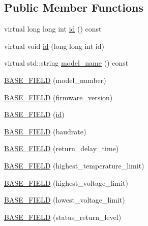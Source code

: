 \subsection*{Public Member Functions}
\begin{DoxyCompactItemize}
\item 
virtual long long int \hyperlink{classdynamixel_1_1servos_1_1_base_servo_a191c1596a4fcbe43cc7b9292f83e196b}{id} () const 
\item 
virtual void \hyperlink{classdynamixel_1_1servos_1_1_base_servo_a20e7410262e37dcd177e81a41d78d8ba}{id} (long long int id)
\item 
virtual std\+::string \hyperlink{classdynamixel_1_1servos_1_1_base_servo_a0878d6f74b1a26bf23fa53a296fd8283}{model\+\_\+name} () const 
\item 
\hyperlink{classdynamixel_1_1servos_1_1_base_servo_ae136ad4ba45eddc402d3638f42d4cbbd}{B\+A\+S\+E\+\_\+\+F\+I\+E\+L\+D} (model\+\_\+number)
\item 
\hyperlink{classdynamixel_1_1servos_1_1_base_servo_aa700a94b75b928640dbcd887417db861}{B\+A\+S\+E\+\_\+\+F\+I\+E\+L\+D} (firmware\+\_\+version)
\item 
\hyperlink{classdynamixel_1_1servos_1_1_base_servo_af3eded69e54365d754ba7715c9af57ae}{B\+A\+S\+E\+\_\+\+F\+I\+E\+L\+D} (\hyperlink{classdynamixel_1_1servos_1_1_base_servo_a191c1596a4fcbe43cc7b9292f83e196b}{id})
\item 
\hyperlink{classdynamixel_1_1servos_1_1_base_servo_a48bfb690093b070720aa7ca522ab6b1a}{B\+A\+S\+E\+\_\+\+F\+I\+E\+L\+D} (baudrate)
\item 
\hyperlink{classdynamixel_1_1servos_1_1_base_servo_abe54af60eda15894e0be32fe7c447906}{B\+A\+S\+E\+\_\+\+F\+I\+E\+L\+D} (return\+\_\+delay\+\_\+time)
\item 
\hyperlink{classdynamixel_1_1servos_1_1_base_servo_ac3c0ffaea0c5adb2245a875bdd0d9a15}{B\+A\+S\+E\+\_\+\+F\+I\+E\+L\+D} (highest\+\_\+temperature\+\_\+limit)
\item 
\hyperlink{classdynamixel_1_1servos_1_1_base_servo_a012af5ca86e8020bf3bd95f2abed4bcd}{B\+A\+S\+E\+\_\+\+F\+I\+E\+L\+D} (highest\+\_\+voltage\+\_\+limit)
\item 
\hyperlink{classdynamixel_1_1servos_1_1_base_servo_ade5dee7e7e3029b7a9779b726f763112}{B\+A\+S\+E\+\_\+\+F\+I\+E\+L\+D} (lowest\+\_\+voltage\+\_\+limit)
\item 
\hyperlink{classdynamixel_1_1servos_1_1_base_servo_a1133c7f435ceb0d82542f609034c7b6a}{B\+A\+S\+E\+\_\+\+F\+I\+E\+L\+D} (status\+\_\+return\+\_\+level)
\item 

\end{DoxyCompactItemize}
